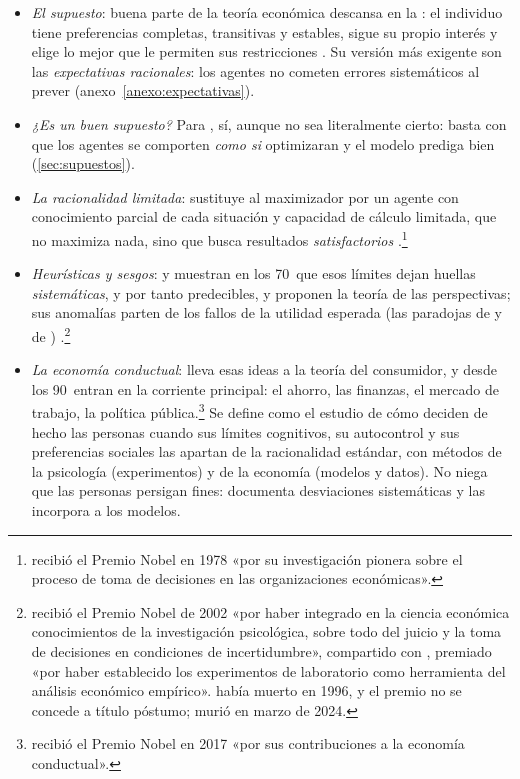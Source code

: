 \documentclass[11pt]{article}
\begin{document}
\begin{itemize}
\item \emph{El supuesto}: buena parte de la teoría económica descansa en la : el individuo tiene preferencias completas, transitivas y estables, sigue su propio interés y elige lo mejor que le permiten sus restricciones . Su versión más exigente son las \emph{expectativas racionales}: los agentes no cometen errores sistemáticos al prever  (anexo~\ref{anexo:expectativas}).
\item \emph{¿Es un buen supuesto?} Para , sí, aunque no sea literalmente cierto: basta con que los agentes se comporten \emph{como si} optimizaran y el modelo prediga bien (\ref{sec:supuestos}).
\item \emph{La racionalidad limitada}:  \parencite*{Simon1955Behavioral} sustituye al maximizador por un agente con conocimiento parcial de cada situación y capacidad de cálculo limitada, que no maximiza nada, sino que busca resultados \emph{satisfactorios} .\footnote{ recibió el Premio Nobel en 1978 «por su investigación pionera sobre el proceso de toma de decisiones en las organizaciones económicas»\nocite{Nobel1978Simon}.}
\item \emph{Heurísticas y sesgos}:  y  muestran en los 70~que esos límites dejan huellas \emph{sistemáticas}, y por tanto predecibles\nocite{TverskyKahneman1974Judgment}, y proponen la teoría de las perspectivas\nocite{KahnemanTversky1979Prospect}; sus anomalías parten de los fallos de la utilidad esperada (las paradojas de  y de ) .\footnote{ recibió el Premio Nobel de 2002 «por haber integrado en la ciencia económica conocimientos de la investigación psicológica, sobre todo del juicio y la toma de decisiones en condiciones de incertidumbre», compartido con , premiado «por haber establecido los experimentos de laboratorio como herramienta del análisis económico empírico»\nocite{Nobel2002Kahneman}.  había muerto en 1996, y el premio no se concede a título póstumo;  murió en marzo de 2024.}
\item \emph{La economía conductual}:  \parencite*{Thaler1980Positive} lleva esas ideas a la teoría del consumidor, y desde los 90~entran en la corriente principal: el ahorro, las finanzas, el mercado de trabajo, la política pública\nocite{Thaler2016Behavioral}.\footnote{ recibió el Premio Nobel en 2017 «por sus contribuciones a la economía conductual»\nocite{Nobel2017Thaler}.} Se define como el estudio de cómo deciden de hecho las personas cuando sus límites cognitivos, su autocontrol y sus preferencias sociales las apartan de la racionalidad estándar, con métodos de la psicología (experimentos) y de la economía (modelos y datos). No niega que las personas persigan fines: documenta desviaciones sistemáticas y las incorpora a los modelos.

\end{itemize}
\end{document}
